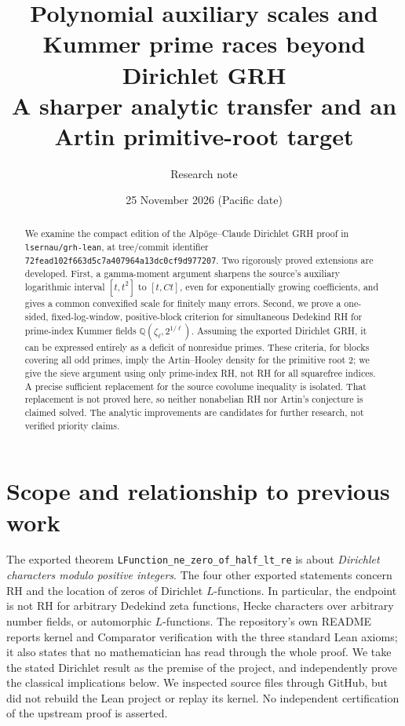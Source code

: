 \documentclass[11pt,letterpaper]{article}
\title{\color{navy}\bfseries Polynomial auxiliary scales and\\ Kummer prime races beyond Dirichlet GRH\\[4pt]\large A sharper analytic transfer and an Artin primitive-root target}
\author{Research note}\date{25 November 2026 (Pacific date)}
\theoremstyle{definition}\newtheorem{definition}[theorem]{Definition}
\theoremstyle{remark}\newtheorem{remark}[theorem]{Remark}
\newcommand{\Q}{\mathbb Q}\newcommand{\C}{\mathbb C}\newcommand{\R}{\mathbb R}\newcommand{\F}{\mathbb F}\newcommand{\ord}{\operatorname{ord}}\newcommand{\Li}{\operatorname{Li}}\newcommand{\Gal}{\operatorname{Gal}}\newcommand{\Res}{\operatorname{Res}}\newcommand{\ind}{\operatorname{Ind}}\newcommand{\one}{\mathbf 1}
\begin{document}
\maketitle
\begin{abstract}
We examine the compact edition of the Alp\"oge--Claude Dirichlet GRH proof in \texttt{lsernau/grh-lean}, at tree/commit identifier \texttt{72fead102f663d5c7a407964a13dc0cf9d977207}. Two rigorously proved extensions are developed. First, a gamma-moment argument sharpens the source's auxiliary logarithmic interval $[t,t^2]$ to $[t,Ct]$, even for exponentially growing coefficients, and gives a common convexified scale for finitely many errors. Second, we prove a one-sided, fixed-log-window, positive-block criterion for simultaneous Dedekind RH for prime-index Kummer fields $\Q(\zeta_\ell,2^{1/\ell})$. Assuming the exported Dirichlet GRH, it can be expressed entirely as a deficit of nonresidue primes. These criteria, for blocks covering all odd primes, imply the Artin--Hooley density for the primitive root $2$; we give the sieve argument using only prime-index RH, not RH for all squarefree indices. A precise sufficient replacement for the source covolume inequality is isolated. That replacement is not proved here, so neither nonabelian RH nor Artin's conjecture is claimed solved. The analytic improvements are candidates for further research, not verified priority claims.
\end{abstract}
\section{Scope and relationship to previous work}
The exported theorem \texttt{LFunction\_ne\_zero\_of\_half\_lt\_re} is about \emph{Dirichlet characters modulo positive integers}. The four other exported statements concern RH and the location of zeros of Dirichlet $L$-functions. In particular, the endpoint is not RH for arbitrary Dedekind zeta functions, Hecke characters over arbitrary number fields, or automorphic $L$-functions. The repository's own README reports kernel and Comparator verification with the three standard Lean axioms; it also states that no mathematician has read through the whole proof. We take the stated Dirichlet result as the premise of the project, and independently prove the classical implications below. We inspected source files through GitHub, but did not rebuild the Lean project or replay its kernel. No independent certification of the upstream proof is asserted.
\end{document}
